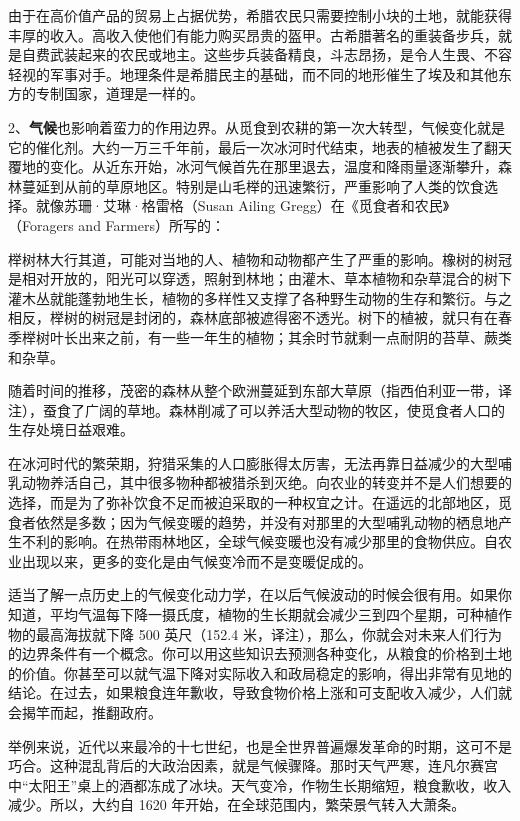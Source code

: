 由于在高价值产品的贸易上占据优势，希腊农民只需要控制小块的土地，就能获得丰厚的收入。高收入使他们有能力购买昂贵的盔甲。古希腊著名的重装备步兵，就是自费武装起来的农民或地主。这些步兵装备精良，斗志昂扬，是令人生畏、不容轻视的军事对手。地理条件是希腊民主的基础，而不同的地形催生了埃及和其他东方的专制国家，道理是一样的。

2、\textbf{气候}也影响着蛮力的作用边界。从觅食到农耕的第一次大转型，气候变化就是它的催化剂。大约一万三千年前，最后一次冰河时代结束，地表的植被发生了翻天覆地的变化。从近东开始，冰河气候首先在那里退去，温度和降雨量逐渐攀升，森林蔓延到从前的草原地区。特别是山毛榉的迅速繁衍，严重影响了人类的饮食选择。就像苏珊·艾琳·格雷格（Susan Ailing Gregg）在《觅食者和农民》（Foragers and Farmers）所写的：


\begin{tcolorbox}
榉树林大行其道，可能对当地的人、植物和动物都产生了严重的影响。橡树的树冠是相对开放的，阳光可以穿透，照射到林地；由灌木、草本植物和杂草混合的树下灌木丛就能蓬勃地生长，植物的多样性又支撑了各种野生动物的生存和繁衍。与之相反，榉树的树冠是封闭的，森林底部被遮得密不透光。树下的植被，就只有在春季榉树叶长出来之前，有一些一年生的植物；其余时节就剩一点耐阴的苔草、蕨类和杂草。 
\end{tcolorbox}

随着时间的推移，茂密的森林从整个欧洲蔓延到东部大草原（指西伯利亚一带，译注），蚕食了广阔的草地。森林削减了可以养活大型动物的牧区，使觅食者人口的生存处境日益艰难。

在冰河时代的繁荣期，狩猎采集的人口膨胀得太厉害，无法再靠日益减少的大型哺乳动物养活自己，其中很多物种都被猎杀到灭绝。向农业的转变并不是人们想要的选择，而是为了弥补饮食不足而被迫采取的一种权宜之计。在遥远的北部地区，觅食者依然是多数；因为气候变暖的趋势，并没有对那里的大型哺乳动物的栖息地产生不利的影响。在热带雨林地区，全球气候变暖也没有减少那里的食物供应。自农业出现以来，更多的变化是由气候变冷而不是变暖促成的。

适当了解一点历史上的气候变化动力学，在以后气候波动的时候会很有用。如果你知道，平均气温每下降一摄氏度，植物的生长期就会减少三到四个星期，可种植作物的最高海拔就下降 500 英尺（152.4 米，译注），那么，你就会对未来人们行为的边界条件有一个概念。你可以用这些知识去预测各种变化，从粮食的价格到土地的价值。你甚至可以就气温下降对实际收入和政局稳定的影响，得出非常有见地的结论。在过去，如果粮食连年歉收，导致食物价格上涨和可支配收入减少，人们就会揭竿而起，推翻政府。

举例来说，近代以来最冷的十七世纪，也是全世界普遍爆发革命的时期，这可不是巧合。这种混乱背后的大政治因素，就是气候骤降。那时天气严寒，连凡尔赛宫中“太阳王”桌上的酒都冻成了冰块。天气变冷，作物生长期缩短，粮食歉收，收入减少。所以，大约自 1620 年开始，在全球范围内，繁荣景气转入大萧条。

